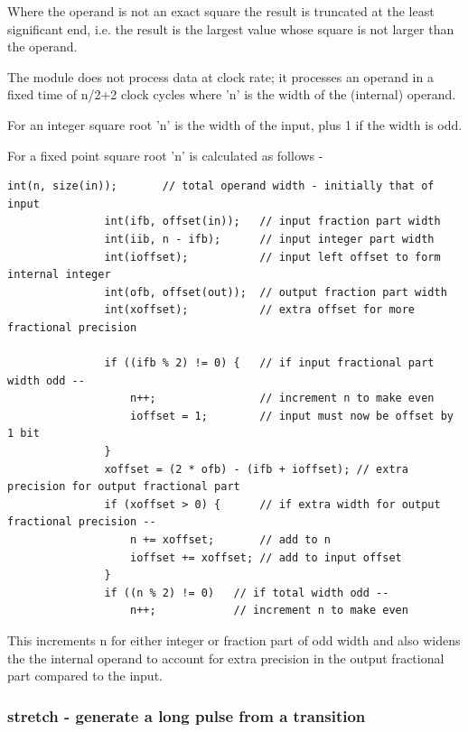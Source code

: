             Where the operand is not an exact square the result is truncated at
            the least significant end, i.e. the result is the largest value
            whose square is not larger than the operand.
            
            The module does not process data at clock rate; it processes an
            operand in a fixed time of n/2+2 clock cycles where 'n' is the width
            of the (internal) operand.
            
            For an integer square root 'n' is the width of the input, plus 1
            if the width is odd.
            
            For a fixed point square root 'n' is calculated as follows -
            \begin{lstlisting}[gobble=12, language=threepl]
               int(n, size(in));       // total operand width - initially that of input
               int(ifb, offset(in));   // input fraction part width
               int(iib, n - ifb);      // input integer part width
               int(ioffset);           // input left offset to form internal integer
               int(ofb, offset(out));  // output fraction part width
               int(xoffset);           // extra offset for more fractional precision

               if ((ifb % 2) != 0) {   // if input fractional part width odd --
                   n++;                // increment n to make even
                   ioffset = 1;        // input must now be offset by 1 bit
               }
               xoffset = (2 * ofb) - (ifb + ioffset); // extra precision for output fractional part
               if (xoffset > 0) {      // if extra width for output fractional precision --
                   n += xoffset;       // add to n
                   ioffset += xoffset; // add to input offset
               }
               if ((n % 2) != 0)   // if total width odd --
                   n++;            // increment n to make even
            \end{lstlisting}
            This increments n for either integer or fraction part of odd width
            and also widens the the internal operand to account for extra
            precision in the output fractional part compared to the input.
            
            



        \subsubsection{stretch - generate a long pulse from a transition}\label{sec:lmstretch}

